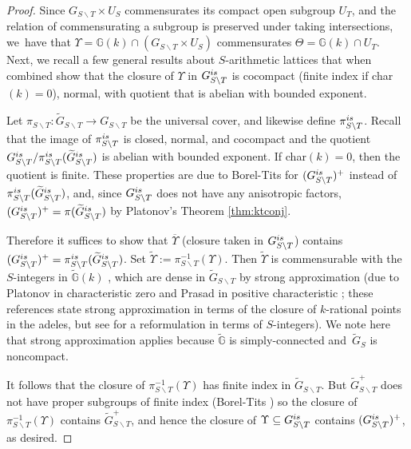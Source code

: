 \documentclass[11pt]{article}
\numberwithin{equation}{section}\providecommand{\llangle}{\langle\!\langle}\providecommand{\rrangle}{\rangle\!\rangle}\providecommand{\Asterisk}{\ast}
\newcommand{\Y}{\ensuremath{\Upsilon}}
\let\bs\backslash
\newcommand{\bbG}{\ensuremath{\mathbb{G}}}
\theoremstyle{definition}
\begin{document}
\begin{proof} Since $G_{S\bs T}\times U_S$ commensurates its compact open subgroup $U_T$, and the relation of commensurating a subgroup is preserved under taking intersections, we~have that $\Y=\bbG(k)\cap (G_{S\bs T}\times U_S)$ commensurates $\Theta=\bbG(k)\cap U_T$. Next, we recall a few general results about $S$-arithmetic lattices that when combined show that the closure of $\Y$ in $G_{S\bs T}^{\textup{is}}$ is cocompact (finite index if char$(k)=0$), normal, with quotient that is abelian with bounded exponent.

Let $\pi_{S\bs T}:\widetilde{G}_{S\bs T}\to G_{S\bs T}$ be the universal cover, and likewise define $\pi_{S\bs T}^{\textup{is}}$. \hbox{Recall} that the image of $\pi_{S\bs T}^{\textup{is}}$ is closed, normal, and cocompact and the quotient $G_{S\bs T}^{\textup{is}}/\pi_{S\bs T}^{\textup{is}}(\widetilde{G}_{S\bs T}^{\textup{is}})$ is abelian with bounded exponent. If char$(k)=0$, then the quotient is finite. These properties are due to Borel-Tits \cite[3.19-20 \& 6.3]{borel-tits-morphismes-abstraits} for $(G_{S\bs T}^{\textup{is}})^+$ instead of $\pi_{S\bs T}^{\textup{is}}(\widetilde{G}_{S\bs T}^{\textup{is}})$, and, since $G_{S\bs T}^{\textup{is}}$ does not have any anisotropic factors, $(G_{S\bs T}^{\textup{is}})^+ = \pi(\widetilde{G}_{S\bs T}^{\textup{is}})$ by Platonov's Theorem \ref{thm:ktconj}.

Therefore it suffices to show that $\overline{\Y}$ (closure taken in $G_{S\bs T}^{\textup{is}}$) contains $(G_{S\bs T}^{\textup{is}})^+=\pi_{S\bs T}^{\textup{is}}(\widetilde{G}_{S\bs T}^{\textup{is}})$. Set $\widetilde{\Y}:=\pi_{S\bs T}^{-1}(\Y)$. Then $\widetilde{\Y}$ is commensurable with the $S$-integers in $\widetilde{\bbG}(k)$ \cite[I.3.2.9]{margulis-book}, which are dense in $\widetilde{G}_{S\bs T}$ by strong approximation (due to Platonov in characteristic zero \cite{platonov-strongapprox} and Prasad in positive characteristic \cite{prasad-strongapprox}; these references state strong approximation in terms of the closure of $k$-rational points in the adeles, but see \cite[Prop.\,7.2(2)]{platonov-rapinchuk-book} for a reformulation in terms of $S$-integers). We note here that strong approximation applies because $\widetilde{\bbG}$ is simply-connected and~$\widetilde{G}_S$ is noncompact.

It follows that the closure of $\pi_{S\bs T}^{-1}(\Y)$ has finite index in $\widetilde{G}_{S\bs T}$. But $\widetilde{G}_{S\bs T}^+$ does not have proper subgroups of finite index (Borel-Tits \cite[6.7]{borel-tits-morphismes-abstraits}) so the closure of $\pi_{S\bs T}^{-1}(\Y)$ contains $\widetilde{G}_{S\bs T}^+$, and hence the closure of $\Y\subseteq G_{S\bs T}^{\textup{is}}$ contains $(G_{S\bs T}^{\textup{is}})^+$, as desired.


\end{proof}
\end{document}
